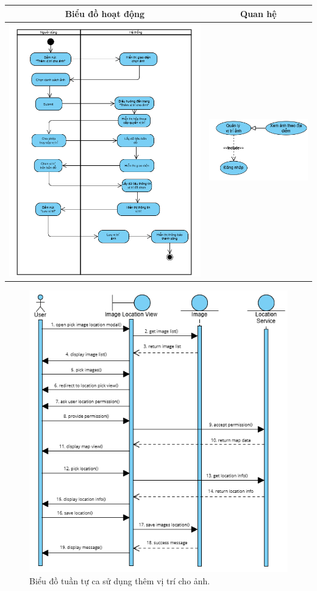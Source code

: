\vspace{0.8cm}

\noindent 
\begin{tabular}{| c | c |}
    \hline
    \textbf{Biểu đồ hoạt động} & \textbf{Quan hệ} \\ 
    \hline
    \includegraphics[width=0.6\linewidth]{figures/c3/3-3-15-activity-diagram.png} 
    &  
    \includegraphics[width=0.35\linewidth]{figures/c3/3-3-15-relationship.png} \\ 
    \hline
\end{tabular}

\begin{figure}[H]
    \centering  
    \includegraphics[width=1.1\textwidth]{figures/c3/3-3-15-sequence-diagram.png}
    \caption{Biểu đồ tuần tự ca sử dụng thêm vị trí cho ảnh.}
    \label{fig:3-3-15-sequence-diagram}
\end{figure}